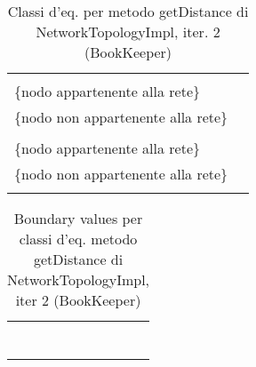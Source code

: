 \documentclass[10pt, a4paper]{article}
\newcommand{\Intmaketable}[4]{
	\begin{longtable}{#3}
	#4
	\caption{#2}
	\label{#1}
	\end{longtable}
}
\newcommand{\Intceqtable}[3]{
	\Intmaketable{#1}{#2}{|l|l|}{
	\hline
	\thead{Parametro formale} & \thead{Classi d'equivalenza} \\
	\hline
	\hline
	#3
	\hline}
}
\newcommand{\Intbvtable}[3]{
	\Intmaketable{#1}{#2}{|l|l|l|}{
	\hline
	\thead{Parametro formale} & \thead{Classe d'equivalenza} & \thead{Boundary value}\\
	\hline
	\hline
	#3
	\hline}
}
\newcommand{\Intceqcaption}[4]{Classi d'eq. per metodo #1 di #2, iter. #3 (#4)}
\newcommand{\Intbvcaption}[4]{Boundary values per classi d'eq. metodo #1 di #2, iter #3 (#4)}
\newcommand{\gettablelabel}[5]{table:#1:#2:#3:iter#4:proj#5}
\newcommand{\ceqtable}[5]{
	\Intceqtable{\gettablelabel{ceq}{#1}{#2}{#3}{#4}}
		{\Intceqcaption{#1}{#2}{#3}{#4}}
		{#5}
}
\newcommand{\bvtable}[5]{
	\Intbvtable{\gettablelabel{bv}{#1}{#2}{#3}{#4}}
		{\Intbvcaption{#1}{#2}{#3}{#4}}
		{#5}
}
\newcommand{\tcell}{\makecell[tl]}
\newcommand{\newtrow}{\\ \hline}
\def\bookkeeper{BookKeeper}
\newcommand{\ceq}[1]{\{#1\}}
\begin{document}
	\ceqtable{getDistance}{NetworkTopologyImpl}{2}{\bookkeeper}{
			\tcell{node1} &
			\tcell{
				\ceq{null}\\
				\ceq{nodo appartenente alla rete} \\
				\ceq{nodo non appartenente alla rete}}
		\newtrow
			\tcell{node2} &
			\tcell{
				\ceq{null}\\
				\ceq{nodo appartenente alla rete} \\
				\ceq{nodo non appartenente alla rete}}
		\newtrow
	}
	
	\bvtable{getDistance}{NetworkTopologyImpl}{2}{\bookkeeper}{
			\tcell{node1} &
			\tcell{\ceq{null}} &
			\tcell{null}
		\newtrow
			\tcell{node1} &
			\tcell{\ceq{nodo appartenente alla rete}} &
			\tcell{Node("/europe/it/lazio/frosinone/rack-1/bookie-1")}
		\newtrow
			\tcell{node1} &
			\tcell{\ceq{nodo non appartenente alla rete}} &
			\tcell{Node("/asia/ru/region-1/moscow/rack-2/bookie-2")}
		\newtrow
			\tcell{node2} &
			\tcell{\ceq{null}} &
			\tcell{null}
		\newtrow
			\tcell{node2} &
			\tcell{\ceq{nodo appartenente alla rete}} &
			\tcell{Node("/europe/it/lazio/frosinone/rack-1/bookie-1")}
		\newtrow
			\tcell{node2} &
			\tcell{\ceq{nodo non appartenente alla rete}} &
			\tcell{Node("/asia/ru/region-1/moscow/rack-2/bookie-2")}
		\newtrow
	}
	
\end{document}
